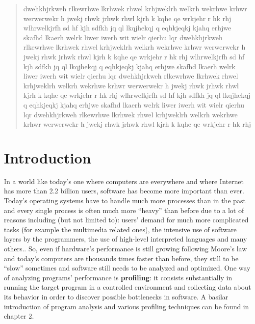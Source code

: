 \documentclass[a4paper,11pt]{report}
\begin{document}
%
%
%
%
%
%

\begin{abstract}
dwehkhjrkweh rlkewrhwe lkrhwek rhwel krhjweklrh welkrh wekrhwe krhwr
werwerwekr h jwekj rhwk jrhwk rhwl kjrh k kqhe qe wrkjehr r hk rhj
wlhrwelkjrfh sd hf kjh sdfkh jq ql lkqjhekqj q eqhkjeqkj kjahq 
erhjwe skafhd lkaerh welrk liwer  iwerh wit wielr qierhu lqr 
dwehkhjrkweh rlkewrhwe lkrhwek rhwel krhjweklrh welkrh wekrhwe krhwr
werwerwekr h jwekj rhwk jrhwk rhwl kjrh k kqhe qe wrkjehr r hk rhj
wlhrwelkjrfh sd hf kjh sdfkh jq ql lkqjhekqj q eqhkjeqkj kjahq 
erhjwe skafhd lkaerh welrk liwer  iwerh wit wielr qierhu lqr 
dwehkhjrkweh rlkewrhwe lkrhwek rhwel krhjweklrh welkrh wekrhwe krhwr
werwerwekr h jwekj rhwk jrhwk rhwl kjrh k kqhe qe wrkjehr r hk rhj
wlhrwelkjrfh sd hf kjh sdfkh jq ql lkqjhekqj q eqhkjeqkj kjahq 
erhjwe skafhd lkaerh welrk liwer  iwerh wit wielr qierhu lqr 
dwehkhjrkweh rlkewrhwe lkrhwek rhwel krhjweklrh welkrh wekrhwe krhwr
werwerwekr h jwekj rhwk jrhwk rhwl kjrh k kqhe qe wrkjehr r hk rhj

\end{abstract}


\tableofcontents

\chapter{Introduction}

In a world like today's one where computers are everywhere and where
\mbox{Internet} has more than 2.2 billion users, software has become more
important than ever. Today's operating systems have to handle much more
processes than in the past and every single process is often much more ``heavy''
than before due to a lot of reasons including (but not limited to): users'
demand for much more complicated tasks (for example the multimedia related
ones), the intensive use of software layers by the programmers, the use of
high-level interpreted languages and many others..
So, even if hardware's performance is still growing following Moore's law and
today's computers are thousands times faster than before, they still to be
``slow'' sometimes and software still needs to be analyzed and optimized.
One way of analyzing programs' performance is \textbf{profiling}: it consists
substantially in running the target program in a controlled environment and
collecting data about its behavior in order to discover possible bottlenecks in
software.
A basilar introduction of program analysis and various profiling techniques can
be found in chapter 2.
\end{document}
